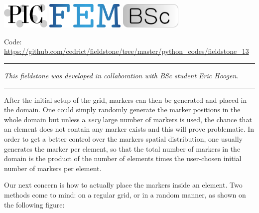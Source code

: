 \includegraphics[height=1.25cm]{images/pictograms/pic}
\includegraphics[height=1.25cm]{images/pictograms/FEM}
\includegraphics[height=1.25cm]{images/pictograms/bsc}




\begin{center}
\inpython 
{\small Code: \url{https://github.com/cedrict/fieldstone/tree/master/python_codes/fieldstone_13}}
\end{center}

\par\noindent\rule{\textwidth}{0.4pt}

{\sl This fieldstone was developed in collaboration with BSc student Eric Hoogen}. 

\par\noindent\rule{\textwidth}{0.4pt}



After the initial setup of the grid, markers can then be 
generated and placed in the domain. One could simply randomly generate 
the marker positions in the whole domain but unless a {\it very} large 
number of markers is used, the chance that an element does 
not contain any marker exists and this will prove problematic. 
In order to get a better control over the markers spatial distribution, 
one usually generates the marker per element, so that the total 
number of markers in the domain is the product of the number of 
elements times the user-chosen initial number of markers per element. 

Our next concern is how to actually place the markers inside an element. 
Two methods come to mind: on a regular grid, or in a random manner, 
as shown on the following figure:


